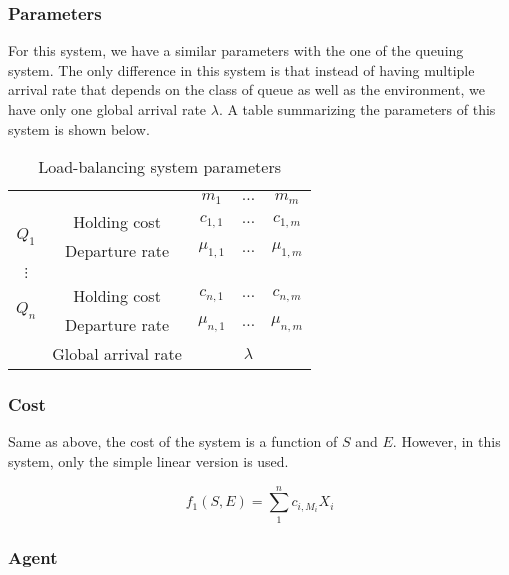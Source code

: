 \documentclass[
  a4paper, xcolor = usenames,dvipsnames]{article}
\begin{document}
\hypertarget{parameters-1}{%
\subsubsection{Parameters}\label{parameters-1}}

For this system, we have a similar parameters with the one of the queuing system. The only difference in this system is that instead of having multiple arrival rate that depends on the class of queue as well as the environment, we have only one global arrival rate \(\lambda\). A table summarizing the parameters of this system is shown below.

\begin{table}[ht]
\caption{Load-balancing system parameters}
\begin{center}
\begin{tabular}{c c c c c}
    \hline
    \multicolumn{2}{c}{} & $m_{1}$ & $\dots$ & $m_{m}$ \\
    \cline{2-5}
    \multirow{2}{*}{$Q_{1}$} &  Holding cost & $c_{1, 1}$ & $\dots$ & $c_{1, m}$ \\
    & Departure rate & $\mu_{1, 1}$ & $\dots$ & $\mu_{1, m}$ \\
    \cline{2-5}
    $\vdots$  \\
    \cline{2-5}
    \multirow{2}{*}{$Q_{n}$} &  Holding cost & $c_{n, 1}$ & $\dots$ & $c_{n, m}$ \\
    & Departure rate & $\mu_{n, 1}$ & $\dots$ & $\mu_{n, m}$ \\
    \cline{2-5}
    & Global arrival rate & & $\lambda$ & \\
    \hline
\end{tabular}
\end{center}
\label{tab:lbs-param}
\end{table}

\hypertarget{cost-1}{%
\subsubsection{Cost}\label{cost-1}}

Same as above, the cost of the system is a function of \(S\) and \(E\). However, in this system, only the simple linear version is used.

\[
f_{1}(S, E) = \sum_{1}^{n} c_{i, M_{i}} X_{i}
\]

\hypertarget{agent-1}{%
\subsubsection{Agent}\label{agent-1}}
\end{document}
